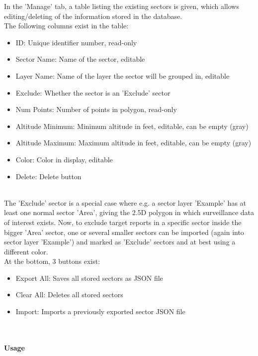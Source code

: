 In the 'Manage' tab, a table listing the existing sectors is given, which allows editing/deleting of the information stored in the database. \\

The following columns exist in the table:
\begin{itemize}
\item ID: Unique identifier number, read-only
\item Sector Name: Name of the sector, editable
\item Layer Name: Name of the layer the sector will be grouped in, editable
\item Exclude: Whether the sector is an 'Exclude' sector
\item Num Points: Number of points in polygon, read-only
\item Altitude Minimum: Minimum altitude in feet, editable, can be empty (gray)
\item Altitude Maximum: Maximum altitude in feet, editable, can be empty (gray)
\item Color: Color in display, editable
\item Delete: Delete button
\end{itemize}
\ \\

The 'Exclude' sector is a special case where e.g. a sector layer 'Example' has at least one normal sector 'Area', giving the 2.5D polygon in which surveillance data of interest exists. 
Now, to exclude target reports in a specific sector inside the bigger 'Area' sector, 
one or several smaller sectors can be imported (again into sector layer 'Example') and marked as 'Exclude' sectors and at best using a different color. \\

At the bottom, 3 buttons exist:

\begin{itemize}
\item Export All: Saves all stored sectors as JSON file
\item Clear All: Deletes all stored sectors
\item Import: Imports a previously exported sector JSON file
\end{itemize}
\ \\

\paragraph {Usage}

